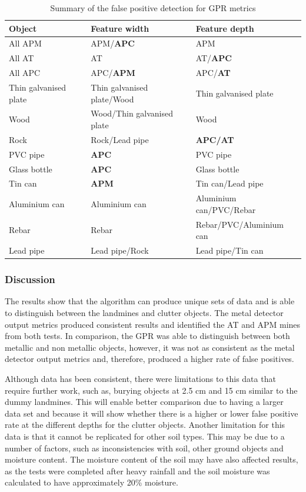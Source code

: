 \documentclass[main.tex]{subfiles}
\begin{document}
\begin{table}[!ht]
\centering
\caption{Summary of the false positive detection for GPR metrics}
\begin{tabular}{lll}
\toprule
Object & Feature width & Feature depth \\ \midrule
All APM & APM/\textbf{APC} & APM \\
All AT & AT & AT/\textbf{APC} \\
All APC & APC/\textbf{APM} & APC/\textbf{AT} \\
Thin galvanised plate & Thin galvanised plate/Wood & Thin galvanised plate \\
Wood & Wood/Thin galvanised plate & Wood \\
Rock & Rock/Lead pipe & \textbf{APC/AT} \\
PVC pipe & \textbf{APC} & PVC pipe \\
Glass bottle & \textbf{APC} & Glass bottle \\
Tin can & \textbf{APM} & Tin can/Lead pipe \\
Aluminium can & Aluminium can & Aluminium can/PVC/Rebar \\
Rebar & Rebar & Rebar/PVC/Aluminium can \\
Lead pipe & Lead pipe/Rock & Lead pipe/Tin can\\ \bottomrule
\end{tabular}
\end{table}

\subsubsection{Discussion}
The results show that the algorithm can produce unique sets of data and is able to distinguish between the landmines and clutter objects. The metal detector output metrics produced consistent results and identified the AT and APM mines from both tests. In comparison, the GPR was able to distinguish between both metallic and non metallic objects, however, it was not as consistent as the metal detector output metrics and, therefore, produced a higher rate of false positives.

Although data has been consistent, there were limitations to this data that require further work, such as, burying objects at 2.5 cm and 15 cm similar to the dummy landmines. This will enable better comparison due to having a larger data set and because it will show whether there is a higher or lower false positive rate at the different depths for the clutter objects.
Another limitation for this data is that it cannot be replicated for other soil types. This may be due to a number of factors, such as inconsistencies with soil, other ground objects and moisture content. The moisture content of the soil may have also affected results, as the tests were completed after heavy rainfall and the soil moisture was calculated to have approximately 20\% moisture. 
\end{document}
